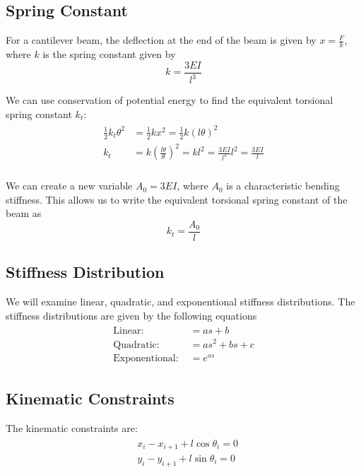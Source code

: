\documentclass[12pt,letterpaper,titlepage]{article}
\begin{document}
\newpage

\subsection{Spring Constant}
For a cantilever beam, the deflection at the end of the beam is given by $x = \frac{F}{k}$, where $k$ is the spring constant given by
\begin{equation}
k = \frac{3EI}{l^3}
\end{equation}

We can use conservation of potential energy to find the equivalent torsional spring constant $k_t$:
\begin{align}
\begin{split}
\frac{1}{2} k_t \theta^2 &= \frac{1}{2} k x^2 = \frac{1}{2} k (l \theta)^2 \\
k_t &= k (\frac{l \theta}{\theta})^2 = k l^2 = \frac{3EI}{l^3} l^2 = \frac{3EI}{l}\\
\end{split}
\end{align}

We can create a new variable $A_0 = 3EI$, where $A_0$ is a characteristic bending stiffness. This allows us to write the equivalent torsional spring constant of the beam as
\begin{equation}
k_t = \frac{A_0}{l}
\end{equation}

\subsection{Stiffness Distribution}
We will examine linear, quadratic, and exponentional stiffness distributions. The stiffness distributions are given by the following equations
\begin{align}
\begin{split}
\text{Linear: } &= as + b \\
\text{Quadratic: } &= as^2 + bs + c \\
\text{Exponentional: } &= e^{as}
\end{split}
\end{align}

\subsection{Kinematic Constraints}
The kinematic constraints are:
\begin{align}
\begin{split}
& {x}_i - {x}_{i+1} + l \cos \theta_i = 0 \\
& {y}_i - {y}_{i+1} + l \sin \theta_i = 0
\end{split}
\end{align}
\end{document}
